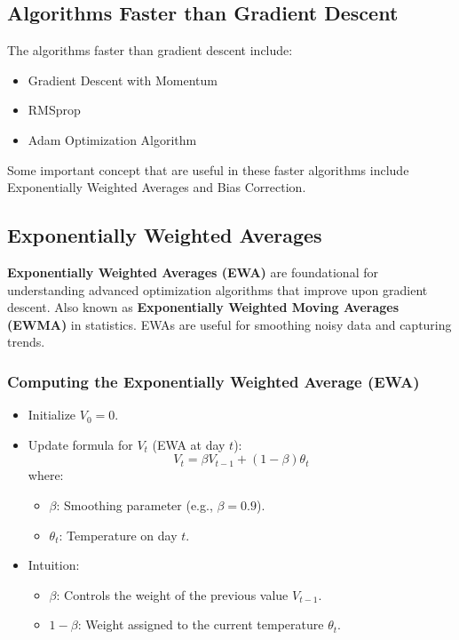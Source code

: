 \documentclass[letterpaper,12pt,notitlepage,twoside]{report}
\begin{document}
\subsection{Algorithms Faster than Gradient Descent}
The algorithms faster than gradient descent include:
\begin{itemize}[nosep]
\item Gradient Descent with Momentum
\item RMSprop
\item Adam Optimization Algorithm
\end{itemize}

Some important concept that are useful in these faster algorithms include Exponentially Weighted Averages and Bias Correction.

\subsection*{Exponentially Weighted Averages}
\textbf{Exponentially Weighted Averages (EWA)} are foundational for understanding advanced optimization algorithms that improve upon gradient descent. Also known as \textbf{Exponentially Weighted Moving Averages (EWMA)} in statistics. EWAs are useful for smoothing noisy data and capturing trends.

\subsubsection{Computing the Exponentially Weighted Average (EWA)}
\begin{itemize}
    \item Initialize \( V_0 = 0 \).
    \item Update formula for \( V_t \) (EWA at day \( t \)):
    \[
    V_t = \beta V_{t-1} + (1 - \beta)\theta_t
    \]
    where:
    \begin{itemize}
        \item \( \beta \): Smoothing parameter (e.g., \( \beta = 0.9 \)).
        \item \( \theta_t \): Temperature on day \( t \).
    \end{itemize}
    \item Intuition:
    \begin{itemize}
        \item \( \beta \): Controls the weight of the previous value \( V_{t-1} \).
        \item \( 1 - \beta \): Weight assigned to the current temperature \( \theta_t \).
    \end{itemize}
\end{itemize}
\end{document}
